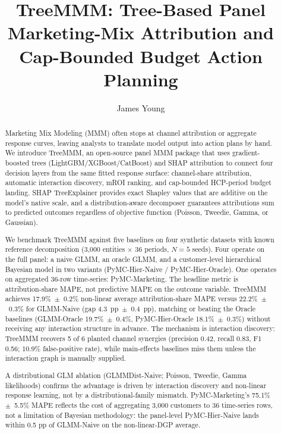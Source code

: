 \documentclass[review,12pt]{elsarticle}
\begin{document}
\begin{frontmatter}

\title{TreeMMM: Tree-Based Panel Marketing-Mix Attribution and
       Cap-Bounded Budget Action Planning}

\author[yd]{James Young}

\begin{abstract}
Marketing Mix Modeling (MMM) often stops at channel attribution or aggregate
response curves, leaving analysts to translate model output into action plans
by hand. We introduce TreeMMM, an open-source panel MMM package that uses
gradient-boosted trees (LightGBM/XGBoost/CatBoost)
\cite{ke2017lightgbm,chen2016xgboost,prokhorenkova2018catboost} and SHAP attribution to
connect four decision layers from the same fitted response surface:
channel-share attribution, automatic interaction discovery, mROI ranking, and
cap-bounded HCP-period budget landing. SHAP TreeExplainer provides exact
Shapley values that are additive on the model's native scale, and a
distribution-aware decomposer guarantees attributions sum to predicted outcomes
regardless of objective function (Poisson, Tweedie, Gamma, or Gaussian).

We benchmark TreeMMM against five baselines on four synthetic datasets with
known reference decomposition (3,000 entities $\times$ 36 periods, $N{=}5$
seeds). Four operate on the full panel: a naive GLMM, an oracle GLMM, and a
customer-level hierarchical Bayesian model in two variants
(PyMC-Hier-Naive / PyMC-Hier-Oracle). One operates on aggregated 36-row
time-series: PyMC-Marketing. The headline metric is attribution-share MAPE,
not predictive MAPE on the outcome variable. TreeMMM achieves
17.9\%~$\pm$~0.2\% non-linear average attribution-share MAPE versus
22.2\%~$\pm$~0.3\% for GLMM-Naive (gap 4.3~pp~$\pm$~0.4~pp), matching or
beating the Oracle baselines (GLMM-Oracle 19.7\%~$\pm$~0.4\%,
PyMC-Hier-Oracle 18.1\%~$\pm$~0.3\%) without receiving any interaction
structure in advance. The mechanism is interaction discovery: TreeMMM recovers
5 of 6 planted channel synergies (precision 0.42, recall 0.83, F1 0.56;
10.9\% false-positive rate), while main-effects baselines miss them unless the
interaction graph is manually supplied.

A distributional GLM ablation (GLMMDist-Naive; Poisson, Tweedie, Gamma
likelihoods) confirms the advantage is driven by interaction discovery and
non-linear response learning, not by a distributional-family mismatch.
PyMC-Marketing's 75.1\%~$\pm$~5.5\% MAPE reflects the cost of aggregating
3,000 customers to 36 time-series rows, not a limitation of Bayesian
methodology: the panel-level PyMC-Hier-Naive lands within 0.5 pp of
GLMM-Naive on the non-linear-DGP average.


\end{abstract}
\end{frontmatter}
\end{document}
